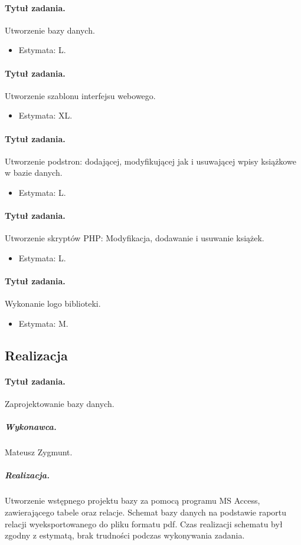 \documentclass[a4paper]{article}
\begin{document}
\paragraph{Tytuł zadania.}Utworzenie bazy danych.
\begin{itemize}
\item Estymata: L.
\end{itemize}

\paragraph{Tytuł zadania.}Utworzenie szablonu interfejsu webowego.
\begin{itemize}
\item Estymata: XL.
\end{itemize}

\paragraph{Tytuł zadania.}Utworzenie podstron: dodającej, modyfikującej jak i usuwającej wpisy książkowe w bazie danych.
\begin{itemize}
\item Estymata: L.
\end{itemize}

\paragraph{Tytuł zadania.} Utworzenie skryptów PHP: Modyfikacja, dodawanie i usuwanie książek.
\begin{itemize}
\item Estymata: L.
\end{itemize}

\paragraph{Tytuł zadania.} Wykonanie logo biblioteki.
\begin{itemize}
\item Estymata: M.
\end{itemize}

\subsection{Realizacja}

\paragraph{Tytuł zadania.} Zaprojektowanie bazy danych.
\subparagraph{Wykonawca.} Mateusz Zygmunt.
\subparagraph{Realizacja.} Utworzenie wstępnego projektu bazy za pomocą programu MS Access, zawierającego tabele oraz relacje. Schemat bazy danych na podstawie raportu relacji wyeksportowanego do pliku formatu pdf. Czas realizacji schematu był zgodny z estymatą, brak trudności podczas wykonywania zadania.
\end{document}
